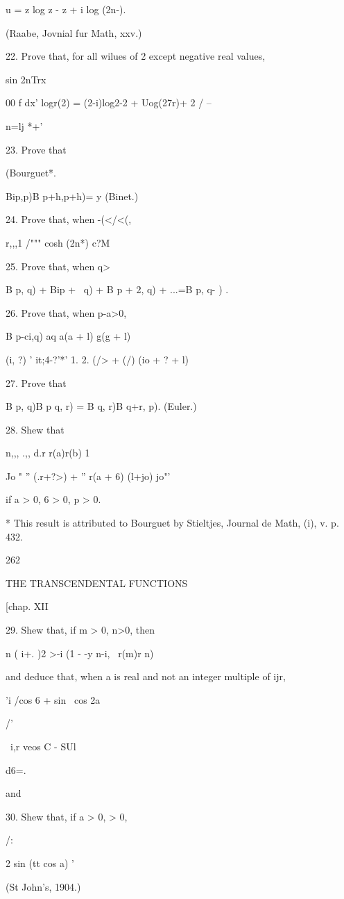 u = z log z - z + i log (2n-).

(Raabe, Jovnial fur Math, xxv.)

22. Prove that, for all wilues of 2 except negative real values,

sin 2nTrx

00 f dx' logr(2) = (2-i)log2-2 + Uog(27r)+ 2 / --

n=lj *+'

23. Prove that

(Bourguet*.

Bip,p)B p+h,p+h)= y (Binet.)

24. Prove that, when -(</<(,

r,,,1 /""" cosh (2n*) c?M

25. Prove that, when q>\,

B p, q) + Bip + \, q) + B p + 2, q) + ...=B p, q- ) .

26. Prove that, when p-a>0,

B p-ci,q) aq a(a + l) g(g + l)

 (i, ?) ' it;4-?'*' 1. 2. (/> + (/) (io + ? + l)  

27. Prove that

B p, q)B p q, r) = B q, r)B q+r, p). (Euler.)

28. Shew that

n,,, .,, d.r r(a)r(b) 1

Jo " '' (.r+?>) + '' r(a + 6) (l+jo) jo"'

if a > 0, 6 > 0, p > 0. 

* This result is attributed to Bourguet by Stieltjes, Journal de Math,
(i), v. p. 432.

262

THE TRANSCENDENTAL FUNCTIONS

[chap. XII

29. Shew that, if m > 0, n>0, then

n ( i+. )2 >-i (1 - -y n-i, \ r(m)r n)

and deduce that, when a is real and not an integer multiple of ijr,

'i /cos 6 + sin \ cos 2a

/'

\ i,r veos C - SUl

d6=.

and

30. Shew that, if a > 0, > 0,

/:

2 sin (tt cos a) '

(St John's, 1904.)

